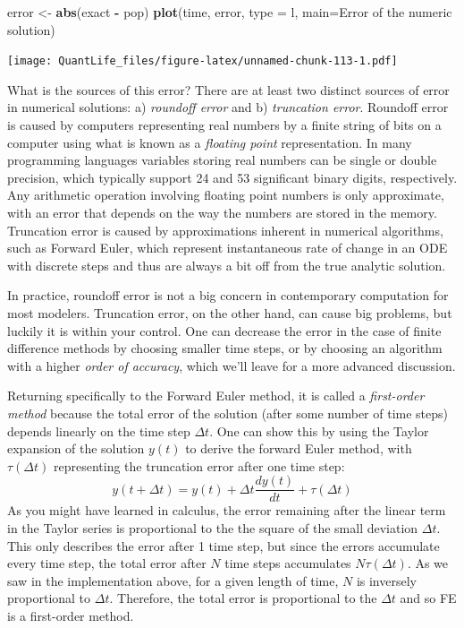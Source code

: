 \documentclass[
]{book}
\newenvironment{Shaded}{\begin{snugshade}}{\end{snugshade}}
\newcommand{\DataTypeTok}[1]{\textcolor[rgb]{0.13,0.29,0.53}{#1}}
\newcommand{\KeywordTok}[1]{\textcolor[rgb]{0.13,0.29,0.53}{\textbf{#1}}}
\newcommand{\NormalTok}[1]{#1}
\newcommand{\OperatorTok}[1]{\textcolor[rgb]{0.81,0.36,0.00}{\textbf{#1}}}
\newcommand{\StringTok}[1]{\textcolor[rgb]{0.31,0.60,0.02}{#1}}
\theoremstyle{definition}
\theoremstyle{definition}
\theoremstyle{definition}
\theoremstyle{remark}
\begin{document}
\begin{Shaded}
\begin{Highlighting}[]
\NormalTok{error \textless{}{-}}\StringTok{ }\KeywordTok{abs}\NormalTok{(exact }\OperatorTok{{-}}\StringTok{ }\NormalTok{pop)}
\KeywordTok{plot}\NormalTok{(time, error, }\DataTypeTok{type =} \StringTok{\textquotesingle{}l\textquotesingle{}}\NormalTok{, }\DataTypeTok{main=}\StringTok{\textquotesingle{}Error of the numeric solution\textquotesingle{}}\NormalTok{)}
\end{Highlighting}
\end{Shaded}

\texttt{[image: QuantLife\_files/figure-latex/unnamed-chunk-113-1.pdf]}

What is the sources of this error? There are at least two distinct sources of error in numerical solutions: a) \emph{roundoff error} and b) \emph{truncation error}. Roundoff error is caused by computers representing real numbers by a finite string of bits on a computer using what is known as a \emph{floating point} representation. In many programming languages variables storing real numbers can be single or double precision, which typically support 24 and 53 significant binary digits, respectively. Any arithmetic operation involving floating point numbers is only approximate, with an error that depends on the way the numbers are stored in the memory. Truncation error is caused by approximations inherent in numerical algorithms, such as Forward Euler, which represent instantaneous rate of change in an ODE with discrete steps and thus are always a bit off from the true analytic solution.

In practice, roundoff error is not a big concern in contemporary computation for most modelers. Truncation error, on the other hand, can cause big problems, but luckily it is within your control. One can decrease the error in the case of finite difference methods by choosing smaller time steps, or by choosing an algorithm with a higher \emph{order of accuracy}, which we'll leave for a more advanced discussion.

Returning specifically to the Forward Euler method, it is called a  \emph{first-order method} because the total error of the solution (after some number of time steps) depends linearly on the time step \(\Delta t\). One can show this by using the Taylor expansion of the solution \(y(t)\) to derive the forward Euler method, with \(\tau(\Delta t)\) representing the truncation error after one time step:
\[y(t+\Delta t) = y(t) +  \Delta t \frac {dy(t) }{dt} + \tau(\Delta t)\]
As you might have learned in calculus, the error remaining after the linear term in the Taylor series is proportional to the the square of the small deviation \(\Delta t\). This only describes the error after 1 time step, but since the errors accumulate every time step, the total error after \(N\) time steps accumulates \(N \tau(\Delta t)\). As we saw in the implementation above, for a given length of time, \(N\) is inversely proportional to \(\Delta t\). Therefore, the total error is proportional to the \(\Delta t\) and so FE is a first-order method.
\end{document}
